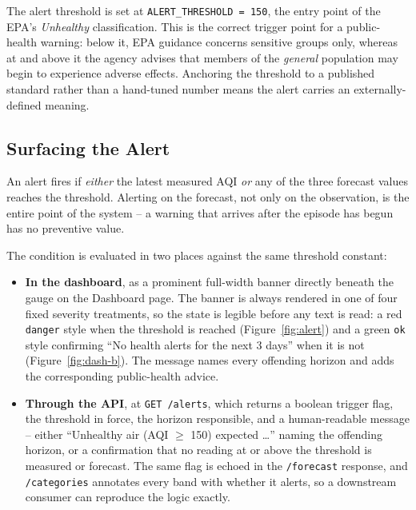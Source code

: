 \documentclass[11pt,a4paper]{article}
\begin{document}
The alert threshold is set at \texttt{ALERT\_THRESHOLD = 150}, the entry point
of the EPA's \emph{Unhealthy} classification. This is the correct trigger point
for a public-health warning: below it, EPA guidance concerns sensitive groups
only, whereas at and above it the agency advises that members of the
\emph{general} population may begin to experience adverse effects. Anchoring
the threshold to a published standard rather than a hand-tuned number means the
alert carries an externally-defined meaning.

\subsection{Surfacing the Alert}

An alert fires if \emph{either} the latest measured AQI \emph{or} any of the
three forecast values reaches the threshold. Alerting on the forecast, not only
on the observation, is the entire point of the system -- a warning that arrives
after the episode has begun has no preventive value.

The condition is evaluated in two places against the same threshold constant:

\begin{itemize}[itemsep=2pt]
  \item \textbf{In the dashboard}, as a prominent full-width banner directly
        beneath the gauge on the Dashboard page. The banner is always rendered
        in one of four fixed severity treatments, so the state is legible
        before any text is read: a red \texttt{danger} style when the
        threshold is reached (Figure~\ref{fig:alert}) and a green
        \texttt{ok} style confirming ``No health alerts for the next 3 days''
        when it is not (Figure~\ref{fig:dash-b}). The message names every
        offending horizon and adds the corresponding public-health advice.
  \item \textbf{Through the API}, at \texttt{GET /alerts}, which returns a
        boolean trigger flag, the threshold in force, the horizon responsible,
        and a human-readable message -- either ``Unhealthy air (AQI $\ge$ 150)
        expected \ldots'' naming the offending horizon, or a confirmation that
        no reading at or above the threshold is measured or forecast. The same
        flag is echoed in the \texttt{/forecast} response, and
        \texttt{/categories} annotates every band with whether it alerts, so a
        downstream consumer can reproduce the logic exactly.
\end{itemize}
\end{document}
